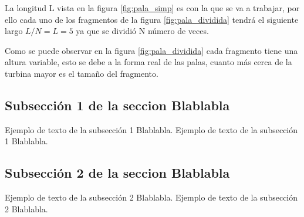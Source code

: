 La longitud L vista en la figura \ref{fig:pala_simp} es con la que se va a trabajar, por ello cada uno de los fragmentos de la figura \ref{fig:pala_dividida} tendrá el siguiente largo $L/N = L = 5$ ya que se dividió N número de veces.


Como se puede observar en la figura \ref{fig:pala_dividida} cada fragmento tiene una altura variable, esto se debe a la forma real de las palas, cuanto más cerca de la turbina mayor es el tamaño del fragmento. 






\subsection{Subsección 1 de la seccion Blablabla}
Ejemplo de texto de la subsección 1 Blablabla. Ejemplo de texto de la subsección 1 Blablabla.

\subsection{Subsección 2 de la seccion Blablabla}
Ejemplo de texto de la subsección 2 Blablabla. Ejemplo de texto de la subsección 2 Blablabla.  

